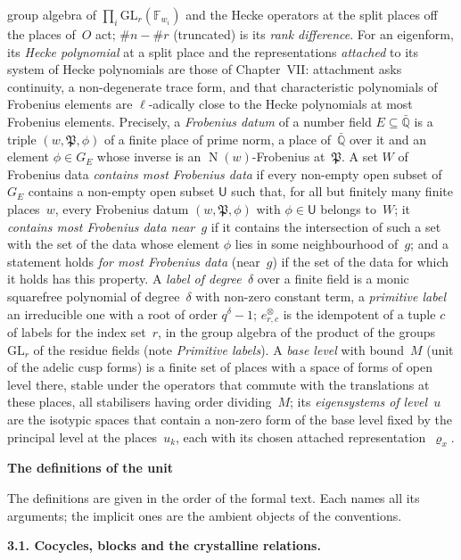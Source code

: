 \documentclass[11pt,a4paper]{article}
\newcommand{\F}{\mathbb{F}}
\newcommand{\m}[1]{\mbox{$#1$}}        %
\newcommand{\sect}[2]{\refstepcounter{section}\label{#2}\par\addvspace{19pt plus 4pt minus 2pt}\Needspace{7\baselineskip}%
  \noindent\llap{{\fontsize{13.2}{16}\selectfont\bfseries\color{inkfaint}\thesection}\hspace{9pt}}%
  {\fontsize{13.2}{16}\selectfont\bfseries\color{ink}#1}\par\nopagebreak\vspace{-1pt}}
\newcommand{\subhead}[1]{\par\addvspace{9pt plus 2pt}\Needspace{4\baselineskip}\noindent\textbf{#1}\enspace\ignorespaces}
\theoremstyle{plainx}
\theoremstyle{uprightx}
\newcommand{\Qb}{\bar{\mathbb{Q}}}
\newcommand{\GE}[1]{G_{#1}}
\newcommand{\Nm}{\operatorname{N}}
\newcommand{\fP}{\mathfrak{P}}
\newcommand{\GL}{\mathrm{GL}}
\newcommand{\tupleIdem}[2]{e^{\otimes}_{#1,#2}}   %
\begin{document}
group algebra of \m{\prod_i\GL_r(\F_{w_i})} and the Hecke operators at the split places off the places of~$O$ act;
\m{\#n-\#r} (truncated) is its \emph{rank difference}. For an eigenform, its \emph{Hecke polynomial} at a split
place and the representations \emph{attached} to its system of Hecke polynomials are those of Chapter~VII:
attachment asks continuity, a non-degenerate trace form, and that characteristic polynomials of Frobenius elements
are $\ell$-adically close to the Hecke polynomials at most Frobenius elements. Precisely, a \emph{Frobenius
datum} of a number field \m{E\subseteq\Qb} is a triple \m{(w,\fP,\phi)} of a finite place of prime norm, a place
of~\m{\Qb} over it and an element \m{\phi\in\GE{E}} whose inverse is an \m{\Nm(w)}-Frobenius at~$\fP$. A set $W$ of
Frobenius data \emph{contains most Frobenius data} if every non-empty open subset of~\m{\GE{E}} contains a
non-empty open subset $\mathsf{U}$ such that, for all but finitely many finite places~$w$, every Frobenius datum
\m{(w,\fP,\phi)} with \m{\phi\in \mathsf{U}} belongs to~$W$; it \emph{contains most Frobenius data near~$g$} if it contains
the intersection of such a set with the set of the data whose element $\phi$ lies in some neighbourhood of~$g$;
and a statement holds \emph{for most Frobenius data} (near~$g$) if the set of the data for which it holds has
this property. A \emph{label of degree~$\delta$}
over a finite field is a monic squarefree polynomial of degree~$\delta$ with non-zero constant term, a
\emph{primitive label} an irreducible one with a root of order \m{q^{\delta}-1}; \m{\tupleIdem{r}{c}} is the
idempotent of a tuple $c$ of labels for the index set~$r$, in the group algebra of the product of the groups
\m{\GL_r} of the residue fields (note \emph{Primitive labels}). A \emph{base level} with bound~$M$ (unit of the adelic cusp
forms) is a finite set of places with a space of forms of open level there, stable under the operators that
commute with the translations at these places, all stabilisers having order dividing~$M$; its \emph{eigensystems
of level~$u$} are the isotypic spaces that contain a non-zero form of the base level fixed by the principal
level at the places~$u_k$, each with its chosen attached representation~\m{\varrho_x}.

\sect{The definitions of the unit}{s:defs}
The definitions are given in the order of the formal text. Each names all its arguments; the implicit ones are
the ambient objects of the conventions.

\subhead{3.1. Cocycles, blocks and the crystalline relations.}
\end{document}
